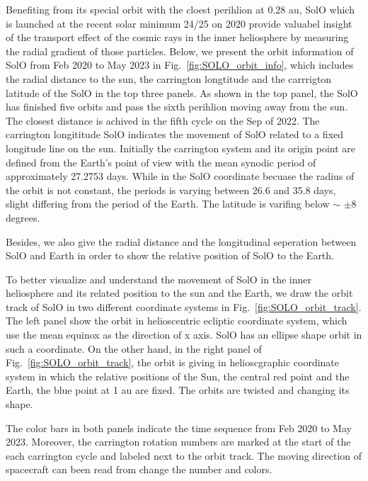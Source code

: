 Benefiting from its special orbit with the cloest perihlion at 0.28 au, \ac{SolO} which is launched at the recent solar minimum 24/25 on 2020 provide valuabel insight of the transport effect of the cosmic rays in the inner heliosphere by measuring the radial gradient of those particles.
Below, we present the orbit information of \ac{SolO} from Feb 2020 to May 2023 in Fig.~\ref{fig:SOLO_orbit_info}, which includes the radial distance to the sun, the carrington longtitude and the carrrigton latitude of the \ac{SolO} in the top three panels. As shown in the top panel, the \ac{SolO} has finished five orbits and pass the sixth perihlion moving away from the sun. The closest distance is achived in the fifth cycle on the Sep of 2022. 
The carrington longititude \ac{SolO} indicates the movement of \ac{SolO} related to a fixed longitude line on the sun. Initially the carrington system and its origin point are defined from the Earth's point of view with the mean synodic period of approximately 27.2753 days. While in the \ac{SolO} coordinate becuase the radius of the orbit is not constant, the periods is varying between 26.6 and 35.8 days, slight differing from the period of the Earth.
The latitude is varifing below $\sim$ $\pm$8 degrees.

Besides, we also give the radial distance and the longitudinal seperation between \ac{SolO} and Earth in order to show the relative position of \ac{SolO} to the Earth.

To better visualize and understand the movement of \ac{SolO} in the inner heliosphere and its related position to the sun and the Earth, we draw the orbit track of \ac{SolO} in two different coordinate systems in Fig.~\ref{fig:SOLO_orbit_track}. The left panel show the orbit in helioscentric ecliptic coordinate system, which use the mean equinox as the direction of x axis. \ac{SolO} has an ellipse shape orbit in such a coordinate. On the other hand, in the right panel of Fig.~\ref{fig:SOLO_orbit_track}, the orbit is giving in helioscgraphic coordinate system in which the relative positions of the Sun, the central red point and the Earth, the blue point at 1 au are fixed. The orbits are twisted and changing its shape.

The color bars in both panels indicate the time sequence from Feb 2020 to May 2023. Moreover, the carrington rotation numbers are marked at the start of the each carrington cycle and labeled next to the orbit track. The moving direction of spacecraft can been read from change the number and colors.


